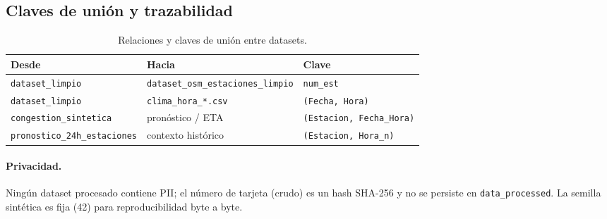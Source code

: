 \documentclass[11pt]{article}
\begin{document}
\subsection{Claves de unión y trazabilidad}
\begin{table}[H]
\centering
\caption{Relaciones y claves de unión entre datasets.}
\label{tab:claves}
\begin{tabularx}{\textwidth}{lll}
\toprule
\textbf{Desde} & \textbf{Hacia} & \textbf{Clave} \\
\midrule
\texttt{dataset\_limpio} & \texttt{dataset\_osm\_estaciones\_limpio} & \texttt{num\_est} \\
\texttt{dataset\_limpio} & \texttt{clima\_hora\_*.csv} & \texttt{(Fecha, Hora)} \\
\texttt{congestion\_sintetica} & pronóstico / ETA & \texttt{(Estacion, Fecha\_Hora)} \\
\texttt{pronostico\_24h\_estaciones} & contexto histórico & \texttt{(Estacion, Hora\_n)} \\
\bottomrule
\end{tabularx}
\end{table}

\paragraph{Privacidad.} Ningún dataset procesado contiene PII; el número de tarjeta (crudo) es un hash
SHA-256 y no se persiste en \texttt{data\_processed}. La semilla sintética es fija (42) para
reproducibilidad byte a byte.

\end{document}
